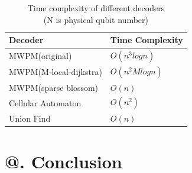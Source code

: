 \documentclass[
    a4paper, %
    10pt, %
    unnumberedsections, %
    twoside, %
]{LTJournalArticle}
\makeatletter
\newcommand{\Rmnum}[1]{\expandafter\@slowromancap\romannumeral #1@}
\makeatother
\begin{document}
\begin{table}[h]
    \caption{Time complexity of different decoders\\(N is physical qubit number)}
    \centering
    \begin{adjustbox}{max width=\columnwidth}
    \begin{tabular}{>{\raggedright\arraybackslash}p{} >{\raggedright\arraybackslash}p{}}
        \toprule
        Decoder & Time Complexity \\
        \midrule
        MWPM(original) & $O(n^3logn)$ \\
        MWPM(M-local-dijkstra) & $O(n^2Mlogn)$ \\
        MWPM(sparse blossom) & $O(n)$ \\
        Cellular Automaton & $O(n^2)$ \\
        Union Find & $O(n)$ \\
        \bottomrule
    \end{tabular}
    \end{adjustbox}
\end{table}


\section{\Rmnum{6}. Conclusion}

\printbibliography
\end{document}
